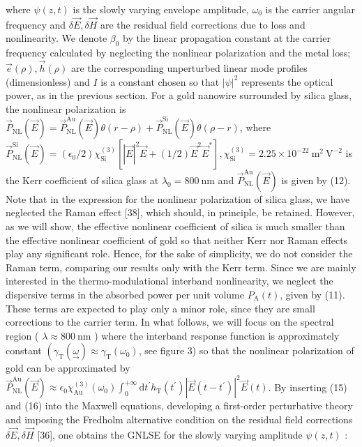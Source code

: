 \documentclass[10pt]{article}
\begin{document}
where $\psi(z, t)$ is the slowly varying envelope amplitude, $\omega_{0}$ is the carrier angular frequency and $\delta \vec{E}, \delta \vec{H}$ are the residual field corrections due to loss and nonlinearity. We denote $\beta_{0}$ by the linear propagation constant at the carrier frequency calculated by neglecting the nonlinear polarization and the metal loss; $\vec{e}(\rho), \vec{h}(\rho)$ are the corresponding unperturbed linear mode profiles (dimensionless) and $I$ is a constant chosen so that $|\psi|^{2}$ represents the optical power, as in the previous section. For a gold nanowire surrounded by silica glass, the nonlinear polarization is $\vec{P}_{\mathrm{NL}}(\vec{E})=\vec{P}_{\mathrm{NL}}^{\mathrm{Au}}(\vec{E}) \theta(r-\rho)+\vec{P}_{\mathrm{NL}}^{\mathrm{Si}}(\vec{E}) \theta(\rho-r)$, where $\vec{P}_{\mathrm{NL}}^{\mathrm{Si}}(\vec{E})= \left(\epsilon_{0} / 2\right) \chi_{\mathrm{Si}}^{(3)}\left[|\vec{E}|^{2} \vec{E}+(1 / 2) \vec{E}^{2} \vec{E}^{*}\right], \chi_{\mathrm{Si}}^{(3)}=2.25 \times 10^{-22} \mathrm{~m}^{2} \mathrm{~V}^{-2}$ is the Kerr coefficient of silica glass at $\lambda_{0}=800 \mathrm{~nm}$ and $\vec{P}_{\mathrm{NL}}^{\mathrm{Au}}(\vec{E})$ is given by (12). Note that in the expression for the nonlinear polarization of silica glass, we have neglected the Raman effect [38], which should, in principle, be retained. However, as we will show, the effective nonlinear coefficient of silica is much smaller than the effective nonlinear coefficient of gold so that neither Kerr nor Raman effects play any significant role. Hence, for the sake of simplicity, we do not consider the Raman term, comparing our results only with the Kerr term. Since we are mainly interested in the thermo-modulational interband nonlinearity, we neglect the dispersive terms in the absorbed power per unit volume $P_{\mathrm{A}}(t)$, given by (11). These terms are expected to play only a minor role, since they are small corrections to the carrier term. In what follows, we will focus on the spectral region ( $\lambda \approx 800 \mathrm{~nm}$ ) where the interband response function is approximately constant $\left(\gamma_{\mathrm{T}}(\underset{\rightarrow}{\omega}) \approx \gamma_{\mathrm{T}}\left(\omega_{0}\right)\right.$, see figure 3) so that the nonlinear polarization of gold can be approximated by $\vec{P}_{\mathrm{NL}}^{\mathrm{Au}}(\vec{E}) \approx \epsilon_{0} \chi_{\mathrm{Au}}^{(3)}\left(\omega_{0}\right) \int_{0}^{+\infty} \mathrm{d} t^{\prime} h_{\mathrm{T}}\left(t^{\prime}\right)\left|\vec{E}\left(t-t^{\prime}\right)\right|^{2} \vec{E}(t)$. By inserting (15) and (16) into the Maxwell equations, developing a first-order perturbative theory and imposing the Fredholm alternative condition on the residual field corrections $\delta \vec{E}, \delta \vec{H}$ [36], one obtains the GNLSE for the slowly varying amplitude $\psi(z, t)$ :
\end{document}
